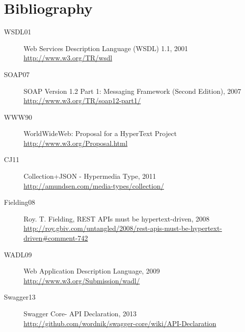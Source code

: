 \documentclass{wsrest2014}
\begin{document}
\section{Bibliography}
\label{_bibliography}
\begin{description} 

 \item[WSDL01] \label{WSDL01}\hypertarget{WSDL01}{} Web Services Description Language (WSDL) 1.1, 2001 \\\href{http://www.w3.org/TR/wsdl}{http://www.w3.org/TR/wsdl}


 \item[SOAP07] \label{SOAP07}\hypertarget{SOAP07}{} SOAP Version 1.2 Part 1: Messaging Framework (Second Edition), 2007 \\\href{http://www.w3.org/TR/soap12-part1/}{http://www.w3.org/TR/soap12-part1/}


 \item[WWW90] \label{WWW90}\hypertarget{WWW90}{} WorldWideWeb: Proposal for a HyperText Project \\\href{http://www.w3.org/Proposal.html}{http://www.w3.org/Proposal.html}


 \item[CJ11] \label{CJ11}\hypertarget{CJ11}{} Collection+JSON - Hypermedia Type, 2011 \\\href{http://amundsen.com/media-types/collection/}{http://amundsen.com/media-types/collection/}


 \item[Fielding08] \label{Fielding08}\hypertarget{Fielding08}{} Roy. T. Fielding, \textquotedbl{}REST APIs must be hypertext-driven\textquotedbl{}, 2008 \\\href{http://roy.gbiv.com/untangled/2008/rest-apis-must-be-hypertext-driven\#{}comment-742}{http://roy.gbiv.com/untangled/2008/rest-apis-must-be-hypertext-driven\#{}comment-742}


 \item[WADL09] \label{WADL09}\hypertarget{WADL09}{} Web Application Description Language, 2009 \\\href{http://www.w3.org/Submission/wadl/}{http://www.w3.org/Submission/wadl/}


 \item[Swagger13] \label{Swagger13}\hypertarget{Swagger13}{} Swagger Core- API Declaration, 2013 \\\href{https://github.com/wordnik/swagger-core/wiki/API-Declaration}{http://github.com/wordnik/swagger-core/wiki/API-Declaration}



\end{description}
\end{document}
